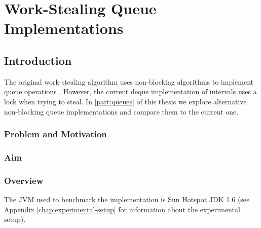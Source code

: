 
\part{Work-Stealing Queue Implementations}
\label{part:queues}




\chapter{Introduction}
\label{chap:queues-introduction}

The original work-stealing algorithm uses non-blocking algorithms to
implement queue operations \cite{Arora2001}. However, the current
deque implementation of intervals uses a lock when trying to steal. In
\autoref{part:queues} of this thesis we explore alternative
non-blocking queue implementations and compare them to the current
one.

\section{Problem and Motivation}
\label{sec:queues-intro-problem-and-motivation}


\section{Aim}
\label{sec:queues-intro-aim}


\section{Overview}
\label{sec:queues-intro-overview}


The JVM used to benchmark the implementation is Sun Hotspot JDK 1.6
(see Appendix \ref{chap:experimental-setup} for information about the
experimental setup).


